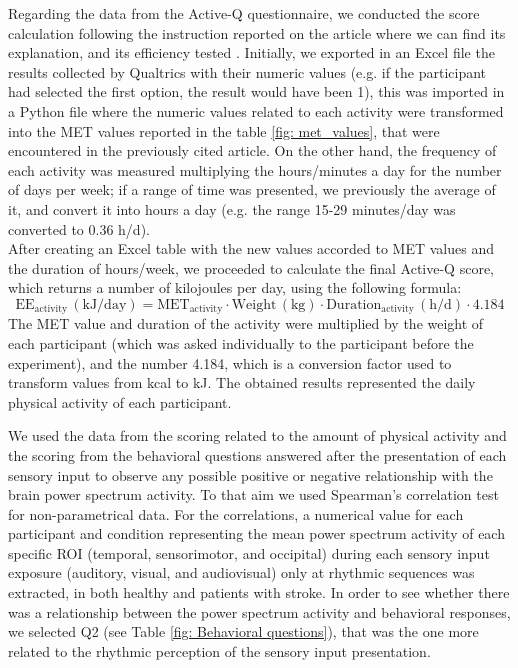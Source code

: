 Regarding the data from the Active-Q questionnaire, we conducted the score calculation following the instruction reported on the article where we can find its explanation, and its efficiency tested \parencite{Bonn_2012}. Initially, we exported in an Excel file the results collected by Qualtrics with their numeric values (e.g. if the participant had selected the first option, the result would have been 1), this was imported in a Python file where the numeric values related to each activity were transformed into the MET values reported in the table \ref{fig: met_values}, that were encountered in the previously cited article. On the other hand, the frequency of each activity was measured multiplying the hours/minutes a day for the number of days per week; if a range of time was presented, we previously the average of it, and convert it into hours a day (e.g. the range 15-29 minutes/day was converted to 0.36 h/d).  \\
After creating an Excel table with the new values accorded to MET values and the duration of hours/week, we proceeded to calculate the final Active-Q score, which returns a number of kilojoules per day, using the following formula: 
\[
\text{EE}_{\text{activity}} \, (\text{kJ/day}) = \text{MET}_{\text{activity}} \cdot \text{Weight} \, (\text{kg}) \cdot \text{Duration}_{\text{activity}} \, (\text{h/d}) \cdot 4.184
\]
The MET value and duration of the activity were multiplied by the weight of each participant (which was asked individually to the participant before the experiment), and the number 4.184, which is a conversion factor used to transform values from kcal to kJ. The obtained results represented the daily physical activity of each participant. 

We used the data from the scoring related to the amount of physical activity and the scoring from the behavioral questions answered after the presentation of each sensory input to observe any possible positive or negative relationship with the brain power spectrum activity. To that aim we used Spearman’s correlation test for non-parametrical data.  
For the correlations, a numerical value for each participant and condition representing the mean power spectrum activity of each specific ROI (temporal, sensorimotor, and occipital) during each sensory input exposure (auditory, visual, and audiovisual) only at rhythmic sequences was  extracted, in both healthy and patients with stroke. 
In order to see whether there was a relationship between the power spectrum activity and behavioral responses, we selected Q2 (see Table \ref{fig: Behavioral questions}), that was the one more related to the rhythmic perception of the sensory input presentation. 